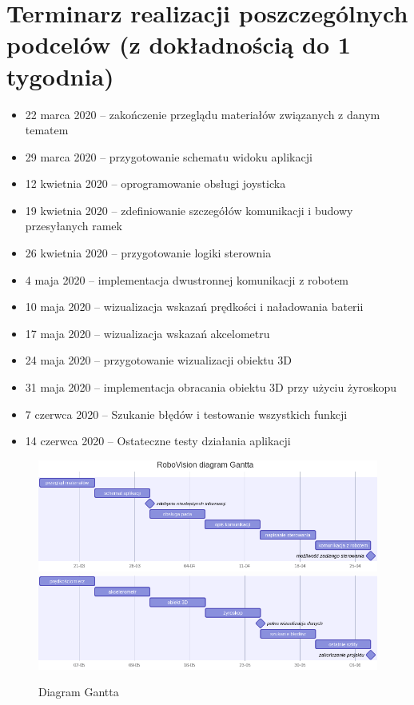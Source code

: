 \documentclass[12pt,a4paper,polish]{article}
\begin{document}
  \newpage
  \section{Terminarz realizacji poszczególnych podcelów 
     {\small (z dokładnością do 1 tygodnia)}}

  \begin{itemize}
    \item 22 marca 2020  -- zakończenie przeglądu materiałów
                            związanych z danym tematem
    \item 29 marca 2020 -- przygotowanie schematu widoku aplikacji
    \item 12 kwietnia 2020 -- oprogramowanie obsługi joysticka
    \item 19 kwietnia 2020 -- zdefiniowanie szczegółów komunikacji i budowy przesyłanych ramek
    \item 26 kwietnia 2020 -- przygotowanie logiki sterownia
    \item  4 maja 2020 -- implementacja dwustronnej komunikacji z robotem
    \item 10 maja 2020 -- wizualizacja wskazań prędkości i naładowania baterii
    \item 17 maja 2020 -- wizualizacja wskazań akcelometru
    \item 24 maja 2020 -- przygotowanie wizualizacji obiektu 3D
    \item 31 maja 2020 -- implementacja obracania obiektu 3D przy użyciu żyroskopu
    \item  7 czerwca 2020 -- Szukanie błędów i testowanie wszystkich funkcji
    \item 14 czerwca 2020 -- Ostateczne testy działania aplikacji
  \end{itemize}

  \begin{figure}[ht]
    \centering
    \includegraphics[width=1\textwidth]{img/gantt1.png}
    \includegraphics[width=1\textwidth]{img/gantt2.png}
    \caption{Diagram Gantta}
    \label{fig:ogniwa}
  \end{figure}
\end{document}
